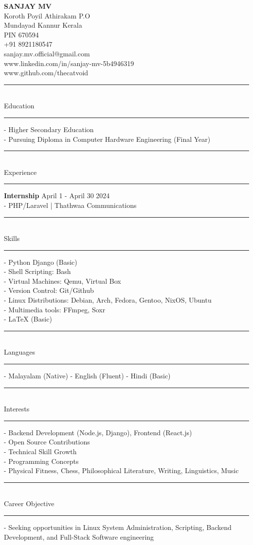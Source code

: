 \documentclass[a4paper,11pt]{article}
\newcommand{\linedtext}[1]{
    \noindent\rule{\textwidth}{0.3mm}\\[0.1em]
    \textcolor[RGB]{110,110,110}{\Large #1} \\[-0.7em]
    \noindent\rule{\textwidth}{0.3mm}
}
\begin{document}
\hspace{-0.5in}
\begin{minipage}[t]{0.4\textwidth}
    \textbf{\huge SANJAY MV} \\[1em]
    \color[RGB]{110,110,110}
    \selectfont
    Koroth Poyil Athirakam P.O \\
    Mundayad Kannur Kerala \\
    PIN 670594 \\[1em]
    +91 8921180547 \\[1em]
    sanjay.mv.official@gmail.com \\
    www.linkedin.com/in/sanjay-mv-5b4946319 \\
    www.github.com/thecatvoid
\end{minipage}

\vspace{-5.5cm}
\hspace{5cm}
\begin{minipage}[t]{0.7\textwidth}
    \linedtext{Education}
    - Higher Secondary Education \\
    - Pursuing Diploma in Computer Hardware Engineering (Final Year)
    \vspace{0.3cm}

    \linedtext{Experience}
    \textbf{Internship} \hspace{5cm} April 1 - April 30 2024 \\
    - PHP/Laravel | Thathwaa Communications
    \vspace{0.3cm}

    \linedtext{Skills}
    - Python Django (Basic) \\
    - Shell Scripting: Bash \\
    - Virtual Machines: Qemu, Virtual Box \\
    - Version Control: Git/Github \\
    - Linux Distributions: Debian, Arch, Fedora, Gentoo, NixOS, Ubuntu \\
    - Multimedia tools: FFmpeg, Soxr \\
    - LaTeX (Basic)
    \vspace{0.3cm}

    \linedtext{Languages}
    - Malayalam (Native)
    - English (Fluent)
    - Hindi (Basic)
    \vspace{0.3cm}

    \linedtext{Interests}
    - Backend Development (Node.js, Django), Frontend (React.js) \\
    - Open Source Contributions \\
    - Technical Skill Growth \\
    - Programming Concepts \\
    - Physical Fitness, Chess, Philosophical Literature, Writing, Linguistics, Music
    \vspace{0.3cm}

    \linedtext{Career Objective}
    - Seeking opportunities in Linux System Administration, Scripting, Backend Development, and Full-Stack Software engineering
\end{minipage}
\end{document}
